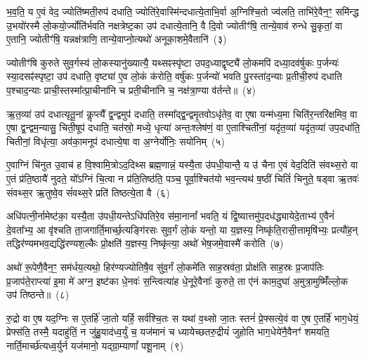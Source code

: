 भ॒व॒ति॒ य ए॒वं वेद॒ ज्योति॑ष्मती॒रुप॑ दधाति॒ ज्योति॑रे॒वास्मि॑न्दधात्ये॒ताभि॒र्वा अ॒ग्निश्चि॒तो ज्व॑लति॒ ताभि॑रे॒वैन॒ꣳ॒ समि॑न्द्ध उ॒भयो॑रस्मै लो॒कयो॒र्ज्योति॑र्भवति नक्षत्रेष्ट॒का उप॑ दधात्ये॒तानि॒ वै दि॒वो ज्योतीꣳ॑षि॒ तान्ये॒वाव॑ रुन्धे सु॒कृतां॒ वा ए॒तानि॒ ज्योतीꣳ॑षि॒ यन्नक्ष॑त्राणि॒ तान्ये॒वाप्नो॒त्यथो॑ अनूका॒शमे॒वैतानि॑~(३)

ज्योतीꣳ॑षि कुरुते सुव॒र्गस्य॑ लो॒कस्यानु॑ख्यात्यै॒ यथ्सꣴस्पृ॑ष्टा उपद॒ध्याद्वृष्ट्यै॑ लो॒कमपि॑ दध्या॒दव॑र्\mbox{}षुकः प॒र्जन्यः॑ स्या॒दसꣴ॑स्पृष्टा॒ उप॑ दधाति॒ वृष्ट्या॑ ए॒व लो॒कं क॑रोति॒ वर्\mbox{}षु॑कः प॒र्जन्यो॑ भवति पु॒रस्ता॑द॒न्याः प्र॒तीची॒रुप॑ दधाति प॒श्चाद॒न्याः प्राची॒स्तस्मा᳚त्प्रा॒चीना॑नि च प्रती॒चीना॑नि च॒ नक्ष॑त्रा॒ण्या व॑र्तन्ते॥~(४)

{\anuvakamend[{भ्रातृ॑व्यो लो॒क ए॒वैतान्येक॑चत्वारिꣳशच्च}]}%

ऋ॒त॒व्या॑ उप॑ दधात्यृतू॒नां कॢप्त्यै᳚ द्व॒न्द्वमुप॑ दधाति॒ तस्मा᳚द्द्व॒न्द्वमृ॒तवो\-ऽधृ॑तेव॒ वा ए॒षा यन्म॑ध्य॒मा चिति॑र॒न्तरि॑क्षमिव॒ वा ए॒षा द्व॒न्द्वम॒न्यासु॒ चिती॒षूप॑ दधाति॒ चत॑स्रो॒ मध्ये॒ धृत्या॑ अन्तः॒श्लेष॑णं॒ वा ए॒ताश्चिती॑नां॒ यदृ॑त॒व्या॑ यदृ॑त॒व्या॑ उप॒दधा॑ति॒ चितीनां॒ विधृ॑त्या॒ अव॑का॒मनूप॑ दधात्ये॒षा वा अ॒ग्नेर्योनिः॒ सयो॑निम्~(५)

ए॒वाग्निं चि॑नुत उ॒वाच॑ ह वि॒श्वामि॒त्रो\-ऽद॒दिथ्स ब्रह्म॒णान्नं॒ यस्यै॒ता उ॑पधी॒यान्तै॒ य उ॑ चैना ए॒वं वेद॒दिति॑ संवथ्स॒रो वा ए॒तं प्र॑ति॒ष्ठायै॑ नुदते॒ यो᳚\-ऽग्निं चि॒त्वा न प्र॑ति॒तिष्ठ॑ति॒ पञ्च॒ पूर्वा॒श्चित॑यो भव॒न्त्यथ॑ ष॒ष्ठीं चितिं॑ चिनुते॒ षड्वा ऋ॒तवः॑ संवथ्स॒र ऋ॒तुष्वे॒व सं॑वथ्स॒रे प्रति॑ तिष्ठत्ये॒ता वै~(६)

अधि॑पत्नी॒र्नामेष्ट॑का॒ यस्यै॒ता उ॑पधी॒यन्ते\-ऽधि॑\-पतिरे॒व स॑मा॒नानां᳚ भवति॒ यं द्वि॒ष्यात्तमु॑प॒दध॑द्ध्यायेदे॒ताभ्य॑ ए॒वैनं॑ दे॒वता᳚भ्य॒ आ वृ॑श्चति ता॒जगार्ति॒मार्च्छ॒त्यङ्गि॑रसः सुव॒र्गं लो॒कं यन्तो॒ या य॒ज्ञस्य॒ निष्कृ॑ति॒रासी॒त्तामृषि॑भ्यः॒ प्रत्यौ॑ह॒न् तद्धिर॑ण्यमभव॒द्यद्धि॑रण्यश॒ल्कैः प्रो॒क्षति॑ य॒ज्ञस्य॒ निष्कृ॑त्या॒ अथो॑ भेष॒जमे॒वास्मै॑ करोति~(७)

अथो॑ रू॒पेणै॒वैन॒ꣳ॒ सम॑र्धय॒त्यथो॒ हिर॑ण्यज्योतिषै॒व सु॑व॒र्गं लो॒कमे॑ति साह॒स्रव॑ता॒ प्रोक्ष॑ति साह॒स्रः प्र॒जा\-प॑तिः प्र॒जा\-प॑ते॒राप्त्या॑ इ॒मा मे॑ अग्न॒ इष्ट॑का धे॒नवः॑ स॒न्त्वित्या॑ह धे॒नूरे॒वैनाः᳚ कुरुते॒ ता ए॑नं काम॒दुघा॑ अ॒मुत्रा॒मुष्मिँ॑ल्लो॒क उप॑ तिष्ठन्ते॥~(८)

{\anuvakamend[{सयो॑निमे॒ता वै क॑रो॒त्येका॒न्नच॑त्वारि॒ꣳ॒शच्च॑}]}%

रु॒द्रो वा ए॒ष यद॒ग्निः स ए॒तर्\mbox{}हि॑ जा॒तो यर्\mbox{}हि॒ सर्व॑श्चि॒तः स यथा॑ व॒थ्सो जा॒तः स्तनं॑ प्रे॒फ्सत्ये॒वं वा ए॒ष ए॒तर्\mbox{}हि॑ भाग॒धेयं॒ प्रेफ्स॑ति॒ तस्मै॒ यदाहु॑तिं॒ न जु॑हु॒याद॑ध्व॒र्युं च॒ यज॑मानं च ध्यायेच्छतरु॒द्रीयं॑ जुहोति भाग॒धेये॑नै॒वैनꣳ॑ शमयति॒ नार्ति॒मार्च्छ॑त्यध्व॒र्युर्न यज॑मानो॒ यद्ग्रा॒म्याणां᳚ पशू॒नाम्~(९)

